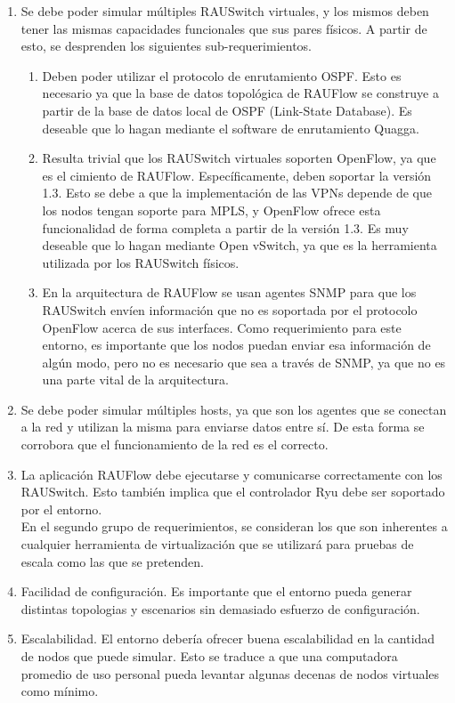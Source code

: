 \begin{enumerate}
	\item Se debe poder simular múltiples RAUSwitch virtuales, y los mismos deben tener las mismas capacidades funcionales que sus pares físicos. A partir de esto, se desprenden los siguientes sub-requerimientos.
	\begin{enumerate}
		\item Deben poder utilizar el protocolo de enrutamiento OSPF. Esto es necesario ya que la base de datos topológica de RAUFlow se construye a partir de la base de datos local de OSPF (Link-State Database).  Es deseable que lo hagan mediante el software de enrutamiento Quagga.
		\item Resulta trivial que los RAUSwitch virtuales soporten OpenFlow, ya que es el cimiento de RAUFlow. Específicamente, deben soportar la versión 1.3. Esto se debe a que la implementación de las VPNs depende de que los nodos tengan soporte para MPLS, y OpenFlow ofrece esta funcionalidad de forma completa a partir de la versión 1.3. Es muy deseable que lo hagan mediante Open vSwitch, ya que es la herramienta utilizada por los RAUSwitch físicos.
		\item En la arquitectura de RAUFlow se usan agentes SNMP para que los RAUSwitch envíen información que no es soportada por el protocolo OpenFlow acerca de sus interfaces. Como requerimiento para este entorno, es importante que los nodos puedan enviar esa información de algún modo, pero no es necesario que sea a través de SNMP, ya que no es una parte vital de la arquitectura.
	\end{enumerate}
	\item Se debe poder simular múltiples hosts, ya que son los agentes que se conectan a la red y utilizan la misma para enviarse datos entre sí. De esta forma se corrobora que el funcionamiento de la red es el correcto.
	\item La aplicación RAUFlow debe ejecutarse y comunicarse correctamente con los RAUSwitch. Esto también implica que el controlador Ryu debe ser soportado por el entorno. \\

En el segundo grupo de requerimientos, se consideran los que son inherentes a cualquier herramienta de virtualización que se utilizará para pruebas de escala como las que se pretenden.
 
	\item Facilidad de configuración. Es importante que el entorno pueda generar distintas topologias y escenarios sin demasiado esfuerzo de configuración.
	\item Escalabilidad. El entorno debería ofrecer buena escalabilidad en la cantidad de nodos que puede simular. Esto se traduce a que una computadora promedio de uso personal pueda levantar algunas decenas de nodos virtuales como mínimo.
\end{enumerate}

